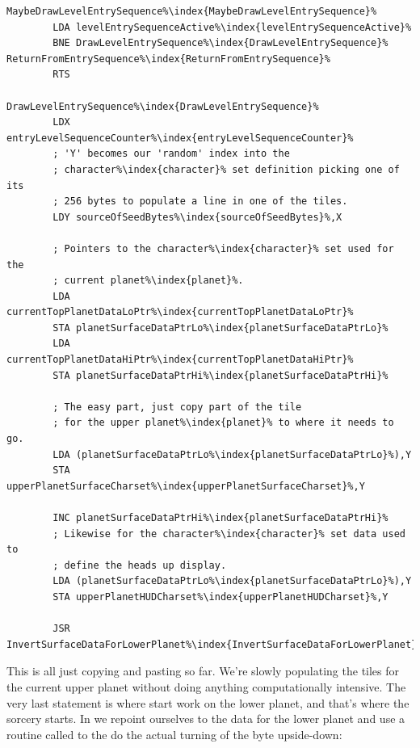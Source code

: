\begin{lstlisting}[escapechar=\%,caption=The start of \icode{MaybeDrawLevelEntrySequence\index{MaybeDrawLevelEntrySequence}}. As long as \icode{levelEntrySequenceActive\index{levelEntrySequenceActive}}
is non-zero\, \icode{DrawLevelEntrySequence\index{DrawLevelEntrySequence}} will run.]
MaybeDrawLevelEntrySequence%\index{MaybeDrawLevelEntrySequence}%
        LDA levelEntrySequenceActive%\index{levelEntrySequenceActive}%
        BNE DrawLevelEntrySequence%\index{DrawLevelEntrySequence}%
ReturnFromEntrySequence%\index{ReturnFromEntrySequence}%   
        RTS

DrawLevelEntrySequence%\index{DrawLevelEntrySequence}%   
        LDX entryLevelSequenceCounter%\index{entryLevelSequenceCounter}%
        ; 'Y' becomes our 'random' index into the
        ; character%\index{character}% set definition picking one of its
        ; 256 bytes to populate a line in one of the tiles.
        LDY sourceOfSeedBytes%\index{sourceOfSeedBytes}%,X

        ; Pointers to the character%\index{character}% set used for the
        ; current planet%\index{planet}%.
        LDA currentTopPlanetDataLoPtr%\index{currentTopPlanetDataLoPtr}%
        STA planetSurfaceDataPtrLo%\index{planetSurfaceDataPtrLo}%
        LDA currentTopPlanetDataHiPtr%\index{currentTopPlanetDataHiPtr}%
        STA planetSurfaceDataPtrHi%\index{planetSurfaceDataPtrHi}%

        ; The easy part, just copy part of the tile
        ; for the upper planet%\index{planet}% to where it needs to go.
        LDA (planetSurfaceDataPtrLo%\index{planetSurfaceDataPtrLo}%),Y
        STA upperPlanetSurfaceCharset%\index{upperPlanetSurfaceCharset}%,Y

        INC planetSurfaceDataPtrHi%\index{planetSurfaceDataPtrHi}%
        ; Likewise for the character%\index{character}% set data used to 
        ; define the heads up display.
        LDA (planetSurfaceDataPtrLo%\index{planetSurfaceDataPtrLo}%),Y
        STA upperPlanetHUDCharset%\index{upperPlanetHUDCharset}%,Y

        JSR InvertSurfaceDataForLowerPlanet%\index{InvertSurfaceDataForLowerPlanet}%
\end{lstlisting}


This is all just copying and pasting so far. We're slowly populating the tiles for the current upper planet without doing
anything computationally intensive. The very last statement is where start work on the lower planet, and that's where
the sorcery starts. In  we repoint ourselves to the data for the lower planet
and use a routine called  to the do the actual turning of the byte upside-down:

